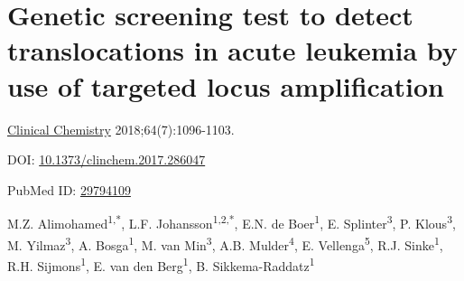 \chapter[Genetic test to detect translocations in acute leukemia]{Genetic screening test to detect translocations in acute leukemia by use of targeted locus amplification}
\label{chap:TLA}

{ \Large {} }

\hfill \underline{Clinical Chemistry} 2018;64(7):1096-1103.

\hfill DOI: \href{https://doi.org/10.1373/clinchem.2017.286047}{10.1373/clinchem.2017.286047}

\hfill PubMed ID: \href{https://www.ncbi.nlm.nih.gov/pubmed/29794109}{29794109}

\newpage

\noindent
M.Z. Alimohamed\textsuperscript{1,*}, L.F. Johansson\textsuperscript{1,2,*}, E.N. de Boer\textsuperscript{1}, E. Splinter\textsuperscript{3}, P. Klous\textsuperscript{3}, M. Yilmaz\textsuperscript{3}, A. Bosga\textsuperscript{1}, M. van Min\textsuperscript{3}, A.B. Mulder\textsuperscript{4}, E. Vellenga\textsuperscript{5}, R.J. Sinke\textsuperscript{1}, R.H. Sijmons\textsuperscript{1}, E. van den Berg\textsuperscript{1}, B. Sikkema-Raddatz\textsuperscript{1}  \\

